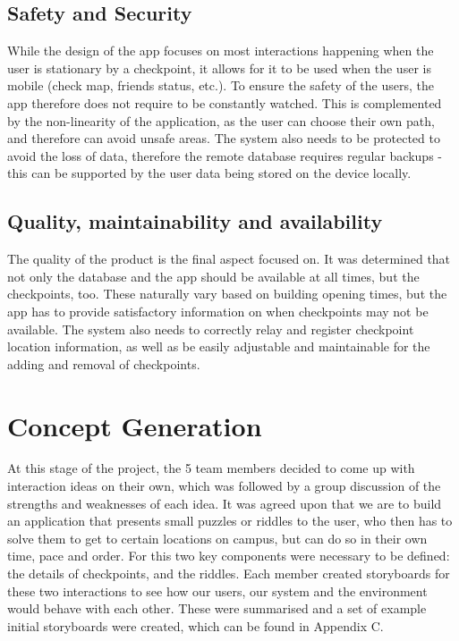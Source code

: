 \documentclass[10pt,twocolumn]{article} %
\begin{document}
\subsection*{Safety and Security}
While the design of the app focuses on most interactions happening when the user is stationary by a checkpoint, it allows for it to be used when the user is mobile (check map, friends status, etc.). To ensure the safety of the users, the app therefore does not require to be constantly watched. This is complemented by the non-linearity of the application, as the user can choose their own path, and therefore can avoid unsafe areas. The system also needs to be protected to avoid the loss of data, therefore the remote database requires regular backups - this can be supported by the user data being stored on the device locally.
\subsection*{Quality, maintainability and availability}
The quality of the product is the final aspect focused on. It was determined that not only the database and the app should be available at all times, but the checkpoints, too. These naturally vary based on building opening times, but the app has to provide satisfactory information on when checkpoints may not be available. The system also needs to correctly relay and register checkpoint location information, as well as be easily adjustable and maintainable for the adding and removal of checkpoints. 

\section*{Concept Generation}
At this stage of the project, the 5 team members decided to come up with interaction ideas on their own, which was followed by a group discussion of the strengths and weaknesses of each idea.
It was agreed upon that we are to build an application that presents small puzzles or riddles to the user, who then has to solve them to get to certain locations on campus, but can do so in their own time, pace and order.
For this two key components were necessary to be defined: the details of checkpoints, and the riddles.
Each member created storyboards for these two interactions to see how our users, our system and the environment would behave with each other.
These were summarised and a set of example initial storyboards were created, which can be found in Appendix C.
\end{document}
